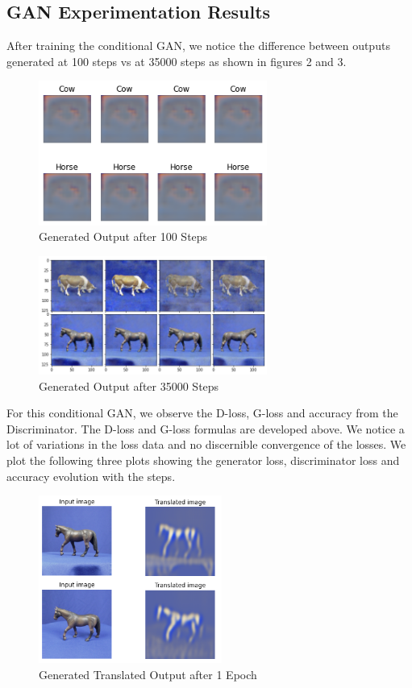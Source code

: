 \documentclass[conference]{IEEEtran}
\begin{document}
\subsection{GAN Experimentation Results}
After training the conditional GAN, we notice the difference between outputs generated at 100 steps vs at 35000 steps as shown in figures 2 and 3.
\begin{figure}[htbp]
\centerline{\includegraphics[width=75mm]{2.png}}
\caption{Generated Output after 100 Steps}
\label{fig}
\end{figure}

\begin{figure}[htbp]
\centerline{\includegraphics[width=75mm]{3.png}}
\caption{Generated Output after 35000 Steps}
\label{fig}
\end{figure}

For this conditional GAN, we observe the D-loss, G-loss and accuracy from the Discriminator. The D-loss and G-loss formulas are developed above. We notice a lot of variations in the loss data and no discernible convergence of the losses. We plot the following three plots showing the generator loss, discriminator loss and accuracy evolution with the steps.

\begin{figure}[htbp]
\centerline{\includegraphics[width=60mm]{5.png}}
\caption{Generated Translated Output after 1 Epoch}
\label{fig}
\end{figure}
\end{document}
